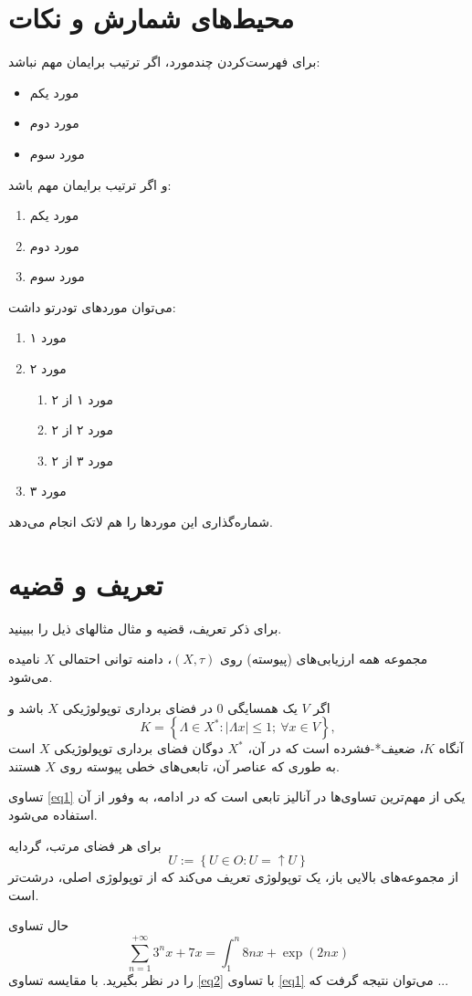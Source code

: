 \section{محیط‌های شمارش و نکات}
برای فهرست‌کردن چندمورد، اگر ترتیب برایمان مهم نباشد:
\begin{itemize}
\item مورد یکم
\item مورد دوم
\item مورد سوم
\end{itemize}
و اگر ترتیب برایمان مهم باشد:
\begin{enumerate}
\item مورد یکم
\item مورد دوم
\item مورد سوم
\end{enumerate}
می‌توان موردهای تودرتو داشت:
\begin{enumerate}
\item مورد ۱
\item مورد ۲
\begin{enumerate}
\item مورد ۱ از ۲
\item مورد ۲ از ۲
\item مورد ۳ از ۲
\end{enumerate}
\item مورد ۳
\end{enumerate}
شماره‌گذاری این موردها را هم لاتک انجام می‌دهد.

\section{تعریف و قضیه}
برای ذکر تعریف، قضیه و مثال مثالهای ذیل را ببینید.
\begin{definition}
مجموعه همه ارزیابی‌های  (پیوسته)  روی $(X,\tau)$، دامنه توانی احتمالی
$ X $
نامیده می‌شود.
\end{definition}
\begin{theorem}
اگر $ V $ یک همسایگی $ 0 $ در فضای برداری 
 توپولوژیکی $ X $ باشد و 
\begin{equation}\label{eq1}
K=\left\lbrace \Lambda \in X^{*}:|\Lambda x|\leqslant 1 ; \ \forall x\in V\right\rbrace,
\end{equation}
آنگاه $ K $،  ضعیف*-فشرده است که در آن، $ X^{*} $ دوگان
 فضای برداری توپولوژیکی $ X $ است به ‌طوری که عناصر آن،  تابعی‌های 
خطی پیوسته
 روی $X$ هستند.
\end{theorem}
تساوی \eqref{eq1} یکی از مهم‌ترین تساوی‌ها در آنالیز تابعی است که در ادامه، به وفور از آن استفاده می‌شود.
\begin{example}
برای هر فضای مرتب، گردایه 
$$U:=\left\lbrace U\in O: U=\uparrow U\right\rbrace $$
از مجموعه‌های بالایی باز، یک توپولوژی تعریف می‌کند که از توپولوژی اصلی، درشت‌تر  است.
\end{example}
حال تساوی 
\begin{equation}\label{eq2}
\sum_{n=1}^{+\infty} 3^{n}x+7x=\int_{1}^{n}8nx+\exp{(2nx)}
\end{equation}
را در نظر بگیرید. با مقایسه تساوی \eqref{eq2} با تساوی \eqref{eq1} می‌توان نتیجه گرفت که ...


